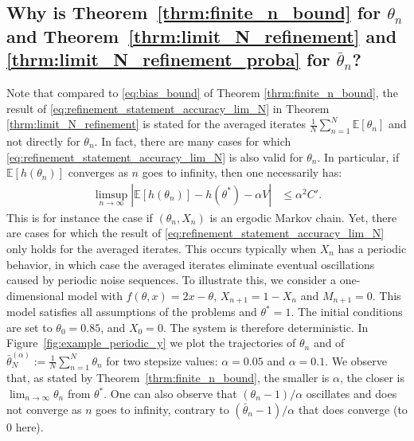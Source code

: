 \documentclass{article}
\newcommand\E{\mathbb{E}}
\newcommand\esp[1]{\E\left[#1\right]}
\newcommand\abs[1]{\left|#1\right|}
\begin{document}
\subsection{Why is Theorem~\ref{thrm:finite_n_bound} for \texorpdfstring{$\theta_n$}{θn} and Theorem~\ref{thrm:limit_N_refinement} and \ref{thrm:limit_N_refinement_proba} for \texorpdfstring{$\bar{\theta}_n$}{bar(θ)n}?}

Note that compared to \eqref{eq:bias_bound} of Theorem \ref{thrm:finite_n_bound}, the result of \eqref{eq:refinement_statement_accuracy_lim_N} in Theorem \ref{thrm:limit_N_refinement} is stated for the averaged iterates $\frac{1}{N}\sum_{n=1}^N \esp{\theta_n}$ and not directly for $\theta_n$. In fact, there are many cases for which \eqref{eq:refinement_statement_accuracy_lim_N} is also valid for $\theta_n$. In particular, if $\esp{h(\theta_n)}$ converges as $n$ goes to infinity, then one necessarily has:
\begin{align*}
    \limsup_{n\to\infty}\abs{\esp{h(\theta_{n})} - h(\theta^*) - \alpha V} & \leq \alpha^2 C'. 
\end{align*}
This is for instance the case if $(\theta_n,X_n)$ is an ergodic Markov chain. 
Yet, there are cases for which the result of \eqref{eq:refinement_statement_accuracy_lim_N} only holds for the averaged iterates. This occurs typically when $X_n$ has a periodic behavior, in which case the averaged iterates eliminate eventual oscillations caused by periodic noise sequences.  To illustrate this, we consider a one-dimensional model with $f(\theta, x)=2 x - \theta$, $X_{n+1}=1-X_n$ and $M_{n+1}=0$.  This model satisfies all assumptions of the problems and $\theta^*=1$. The initial conditions are set to $\theta_0=0.85$, and $X_0=0$. The system is therefore deterministic. In Figure~\ref{fig:example_periodic_y} we plot the trajectories of $\theta_n$ and of $\bar{\theta}^{(\alpha)}_N :=\frac1N \sum_{n=1}^{N} \theta_{n}$ for two stepsize values: $\alpha=0.05$ and $\alpha=0.1$. We observe that, as stated by Theorem~\ref{thrm:finite_n_bound}, the smaller is $\alpha$, the closer is $\lim_{n\to\infty}\theta_{n}$ from $\theta^*$. One can also observe that $(\theta_n - 1)/\alpha$ oscillates and does not converge as $n$ goes to infinity, contrary to $(\bar{\theta}_n-1)/\alpha$ that does converge (to $0$ here).
\end{document}
